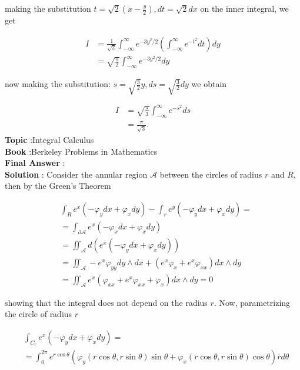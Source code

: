 \documentclass[10pt]{article}
\begin{document}
making the substitution $t=\sqrt{2}\left(x-\frac{y}{2}\right), d t=\sqrt{2} d x$ on the inner integral, we get

$$
\begin{aligned}
I &=\frac{1}{\sqrt{2}} \int_{-\infty}^{\infty} e^{-3 y^{2} / 2}\left(\int_{-\infty}^{\infty} e^{-t^{2}} d t\right) d y \\
&=\sqrt{\frac{\pi}{2}} \int_{-\infty}^{\infty} e^{-3 y^{2} / 2} d y
\end{aligned}
$$

now making the substitution: $s=\sqrt{\frac{3}{2}} y, d s=\sqrt{\frac{3}{2}} d y$ we obtain

$$
\begin{aligned}
I &=\sqrt{\frac{\pi}{3}} \int_{-\infty}^{\infty} e^{-s^{2}} d s \\
&=\frac{\pi}{\sqrt{3}} .
\end{aligned}
$$
\textbf{Topic} :Integral Calculus \\
\textbf{Book} :Berkeley Problems in Mathematics\\
\textbf{Final Answer} :\\


\textbf{Solution} : Consider the annular region $\mathcal{A}$ between the circles of radius $r$ and $R$, then by the Green's Theorem

$$
\begin{aligned}
&\int_{R} e^{x}\left(-\varphi_{y} d x+\varphi_{x} d y\right)-\int_{r} e^{y}\left(-\varphi_{y} d x+\varphi_{x} d y\right)= \\
&=\int_{\partial \mathcal{A}} e^{x}\left(-\varphi_{x} d x+\varphi_{x} d y\right) \\
&=\iint_{\mathcal{A}} d\left(e^{x}\left(-\varphi_{y} d x+\varphi_{x} d y\right)\right) \\
&=\iint_{\mathcal{A}}-e^{x} \varphi_{y y} d y \wedge d x+\left(e^{x} \varphi_{x}+e^{x} \varphi_{x x}\right) d x \wedge d y \\
&=\iint_{\mathcal{A}} e^{x}\left(\varphi_{x x}+e^{x} \varphi_{x x}+\varphi_{x}\right) d x \wedge d y=0
\end{aligned}
$$

showing that the integral does not depend on the radius $r$. Now, parametrizing the circle of radius $r$

$$
\begin{aligned}
&\int_{C_{r}} e^{x}\left(-\varphi_{y} d x+\varphi_{x} d y\right)= \\
&=\int_{0}^{2 \pi} e^{r \cos \theta}\left(\varphi_{y}(r \cos \theta, r \sin \theta) \sin \theta+\varphi_{x}(r \cos \theta, r \sin \theta) \cos \theta\right) r d \theta
\end{aligned}
$$
\end{document}
